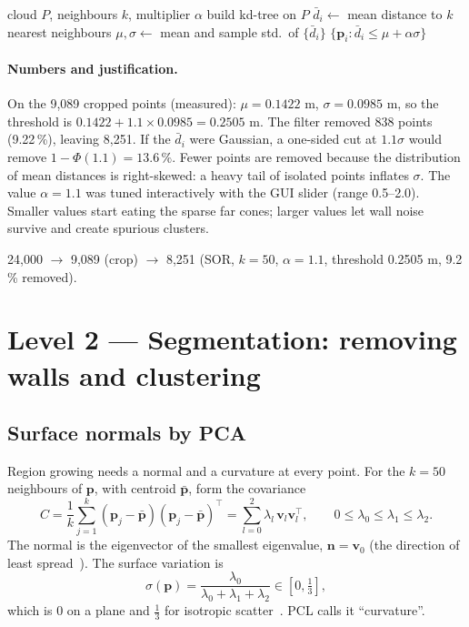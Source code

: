 \documentclass[10pt,a4paper]{scrartcl}
\renewcommand{\emph}[1]{\textcolor{accent}{#1}}
\newcommand{\code}[1]{\texttt{#1}}
\newcommand{\RuleSection}[1]{%
    \section{#1}%
    \vspace{0.2em}{\color{accent!35}\hrule height 0.4pt}\vspace{0.3em}%
  }
\begin{document}
  \begin{algorithm}[H]
  \caption{Statistical outlier removal (PCL \code{StatisticalOutlierRemoval})}
  \begin{algorithmic}[1]
  \Require cloud $P$, neighbours $k$, multiplier $\alpha$
  \State build kd-tree on $P$ 
   \State $\bar d_i\gets$ mean distance to $k$ nearest neighbours 
  \EndFor
  \State $\mu,\sigma\gets$ mean and sample std.\ of $\{\bar d_i\}$
  \State \Return $\{\bm p_i : \bar d_i\le \mu+\alpha\sigma\}$
  \end{algorithmic}
  \end{algorithm}

  \paragraph{Numbers and justification.} On the 9,089 cropped points (measured):
  $\mu=0.1422$ m, $\sigma=0.0985$ m, so the threshold is
  $0.1422+1.1\times0.0985=0.2505$ m. The filter removed 838 points (9.22\,\%),
  leaving 8,251. If the $\bar d_i$ were Gaussian, a one-sided cut at $1.1\sigma$ would
  remove $1-\Phi(1.1)=13.6\,\%$. Fewer points are removed because the distribution of
  mean distances is right-skewed: a heavy tail of isolated points inflates $\sigma$.
  The value $\alpha=1.1$ was tuned interactively with the GUI slider (range
  0.5--2.0). Smaller values start eating the sparse far cones; larger values let
  wall noise survive and create spurious clusters.

  \begin{keybox}
  \small 24,000 $\to$ 9,089 (crop) $\to$ 8,251 (SOR, $k=50$, $\alpha=1.1$, threshold 0.2505 m, 9.2\,\% removed).
  \end{keybox}

  \RuleSection{Level 2 --- Segmentation: removing walls and clustering}
  \label{sec:l2}

  \subsection{Surface normals by PCA}

  Region growing needs a normal and a curvature at every point. For the $k=50$
  neighbours of $\bm p$, with centroid $\bar{\bm p}$, form the covariance
  \begin{equation}
    C=\frac1k\sum_{j=1}^{k}(\bm p_j-\bar{\bm p})(\bm p_j-\bar{\bm p})^\top
     = \sum_{l=0}^{2}\lambda_l\,\bm v_l\bm v_l^\top,\qquad 0\le\lambda_0\le\lambda_1\le\lambda_2 .
  \end{equation}
  The normal is the eigenvector of the smallest eigenvalue, $\bm n=\bm v_0$ (the
  direction of least spread~\citep{hoppe1992surface}). The \emph{surface variation}
  is
  \begin{equation}
    \sigma(\bm p)=\frac{\lambda_0}{\lambda_0+\lambda_1+\lambda_2}\in\left[0,\tfrac13\right],
  \end{equation}
  which is $0$ on a plane and $\tfrac13$ for isotropic scatter~\citep{pauly2002efficient}.
  PCL calls it ``curvature''.
\end{document}
